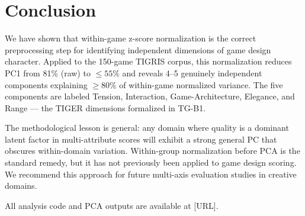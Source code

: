 \section{Conclusion}
\label{sec:conclusion}

We have shown that within-game z-score normalization is the correct preprocessing step
for identifying independent dimensions of game design character. Applied to the 150-game
TIGRIS corpus, this normalization reduces PC1 from 81\% (raw) to $\leq 55\%$ and reveals
4--5 genuinely independent components explaining $\geq 80\%$ of within-game normalized
variance. The five components are labeled Tension, Interaction, Game-Architecture,
Elegance, and Range --- the TIGER dimensions formalized in TG-B1.

The methodological lesson is general: any domain where quality is a dominant latent
factor in multi-attribute scores will exhibit a strong general PC that obscures
within-domain variation. Within-group normalization before PCA is the standard remedy,
but it has not previously been applied to game design scoring. We recommend this approach
for future multi-axis evaluation studies in creative domains.

All analysis code and PCA outputs are available at [URL].
